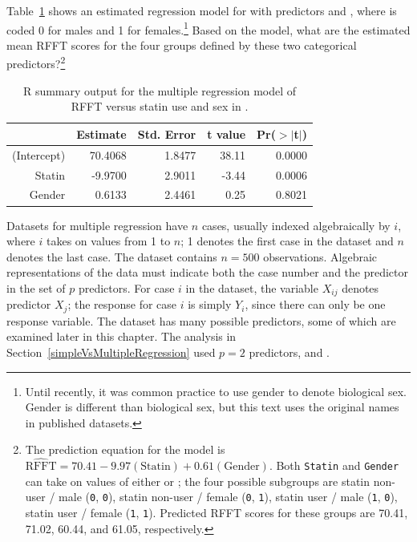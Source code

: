 \begin{exercise}
Table~\ref{prevendRFFTStatinGenderRegression} shows an estimated regression model for  with predictors  and , where  is coded 0 for males and 1 for females.\footnote{Until recently, it was common practice to use gender to denote biological sex. Gender is different than biological sex, but this text uses the original names in published datasets.}  Based on the model, what are the estimated mean RFFT scores for the four groups defined by these two categorical predictors?\footnote{The prediction equation for the model is $\widehat{\text{RFFT}} = 70.41 - 9.97(\text{Statin}) + 0.61(\text{Gender})$. Both \texttt{Statin} and \texttt{Gender} can take on values of either  or ; the four possible subgroups are statin non-user / male (\texttt{0}, \texttt{0}), statin non-user / female (\texttt{0}, \texttt{1}), statin user / male (\texttt{1}, \texttt{0}), statin user / female (\texttt{1}, \texttt{1}). Predicted RFFT scores for these groups are 70.41, 71.02, 60.44, and 61.05, respectively.} 
\begin{table}[ht]
\centering
\begin{tabular}{rrrrr}
  \hline
 & Estimate & Std. Error & t value & Pr($>$$|$t$|$) \\ 
  \hline
(Intercept) & 70.4068 & 1.8477 & 38.11 & 0.0000 \\ 
  Statin & -9.9700 & 2.9011 & -3.44 & 0.0006 \\ 
  Gender & 0.6133 & 2.4461 & 0.25 & 0.8021 \\ 
   \hline
\end{tabular}
\caption{\textsf{R} summary output for the multiple regression model of RFFT versus statin use and sex in .}
\label{prevendRFFTStatinGenderRegression}
\end{table}
\end{exercise}

Datasets for multiple regression have $n$ cases, usually indexed algebraically by $i$, where $i$ takes on values from 1 to $n$; 1 denotes the first case in the dataset and $n$ denotes the last case.  The dataset  contains $n = 500$ observations.  Algebraic representations of the data must indicate both the case number and the predictor in the set of $p$ predictors. For case $i$ in the dataset, the variable $X_{ij}$ denotes predictor $X_j$; the response for case $i$ is simply $Y_i$, since there can only be one response variable. The dataset  has many possible predictors, some of which are examined later in this chapter.  The analysis in Section~\ref{simpleVsMultipleRegression} used $p=2$ predictors,  and .

